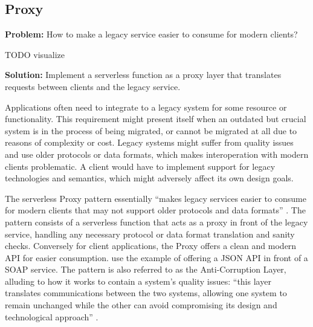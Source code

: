 


\subsection{Proxy} \label{subsec:proxy}

\textbf{Problem:} How to make a legacy service easier to consume for modern clients?

TODO visualize

\textbf{Solution:} Implement a serverless function as a proxy layer that translates requests between clients and the legacy service.

Applications often need to integrate to a legacy system for some resource or functionality. This requirement might present itself when an outdated but crucial system is in the process of being migrated, or cannot be migrated at all due to reasons of complexity or cost. Legacy systems might suffer from quality issues and use older protocols or data formats, which makes interoperation with modern clients problematic. A client would have to implement support for legacy technologies and semantics, which might adversely affect its own design goals. \parencite{microsoft18cloudPatterns}

The serverless Proxy pattern essentially ``makes legacy services easier to consume for modern clients that may not support older protocols and data formats'' \parencite{sbarski2017serverless}. The pattern consists of a serverless function that acts as a proxy in front of the legacy service, handling any necessary protocol or data format translation and sanity checks. Conversely for client applications, the Proxy offers a clean and modern API for easier consumption. \textcite{sbarski2017serverless} use the example of offering a JSON API in front of a SOAP service. The pattern is also referred to as the Anti-Corruption Layer, alluding to how it works to contain a system's quality issues: ``this layer translates communications between the two systems, allowing one system to remain unchanged while the other can avoid compromising its design and technological approach'' \parencite{microsoft18cloudPatterns}.

